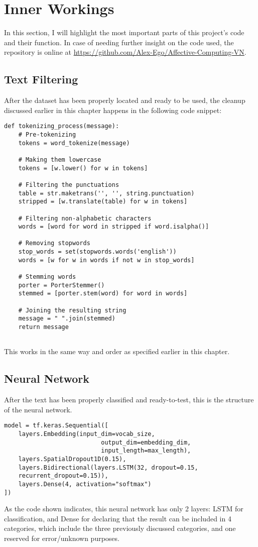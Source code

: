\section{Inner Workings}
In this section, I will highlight the most important parts of this project's code and their function. In case of needing further insight on the code used, the repository is online at \url{https://github.com/Alex-Ego/Affective-Computing-VN}.
\subsection{Text Filtering}
After the dataset has been properly located and ready to be used, the cleanup discussed earlier in this chapter happens in the following code snippet:
\begin{lstlisting}
def tokenizing_process(message):
    # Pre-tokenizing
    tokens = word_tokenize(message)
    
    # Making them lowercase
    tokens = [w.lower() for w in tokens]
    
    # Filtering the punctuations
    table = str.maketrans('', '', string.punctuation)
    stripped = [w.translate(table) for w in tokens]
    
    # Filtering non-alphabetic characters
    words = [word for word in stripped if word.isalpha()]
    
    # Removing stopwords
    stop_words = set(stopwords.words('english'))
    words = [w for w in words if not w in stop_words]
    
    # Stemming words
    porter = PorterStemmer()
    stemmed = [porter.stem(word) for word in words]
    
    # Joining the resulting string
    message = " ".join(stemmed)
    return message
    
\end{lstlisting}
This works in the same way and order as specified earlier in this chapter.
\subsection{Neural Network}
After the text has been properly classified and ready-to-test, this is the structure of the neural network.
\begin{lstlisting}
model = tf.keras.Sequential([
    layers.Embedding(input_dim=vocab_size, 
                           output_dim=embedding_dim, 
                           input_length=max_length),
    layers.SpatialDropout1D(0.15),
    layers.Bidirectional(layers.LSTM(32, dropout=0.15, 
    recurrent_dropout=0.15)),
    layers.Dense(4, activation="softmax")
])
\end{lstlisting} 
As the code shown indicates, this neural network has only 2 layers: LSTM for classification, and Dense for declaring that the result can be included in 4 categories, which include the three previously discussed categories, and one reserved for error/unknown purposes.